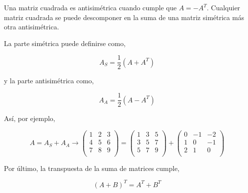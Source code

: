 \begin{paracol}{2}
Una matriz cuadrada es antisimétrica cuando cumple que $A=-A^T$. Cualquier matriz cuadrada se puede descomponer en la suma de una matriz simétrica más otra antisimétrica.

La parte simétrica puede definirse como,
    
\end{paracol}
\begin{equation*}
A_S=\frac{1}{2} \left( A+A^T \right)
\end{equation*}

\begin{paracol}{2}
y la parte antisimétrica como,    
\end{paracol}

\begin{equation*}
A_A=\frac{1}{2}\left( A-A^T \right)
\end{equation*}
\begin{paracol}{2}
Así, por ejemplo,
\end{paracol}
\begin{equation*}
 A=A_S+A_A \rightarrow
\begin{pmatrix}
1& 2& 3\\
4& 5& 6\\
7& 8& 9\\
\end{pmatrix} =
\begin{pmatrix}
1& 3& 5\\
3& 5& 7\\
5& 7& 9\\
\end{pmatrix} +
\begin{pmatrix}
0& -1& -2\\
1& 0& -1\\
2& 1& 0\\
\end{pmatrix}
\end{equation*}
\begin{paracol}{2}
Por último, la transpuesta de la suma de matrices cumple,
\end{paracol}

\begin{equation*}
(A+B)^T=A^T+B^T
\end{equation*}

